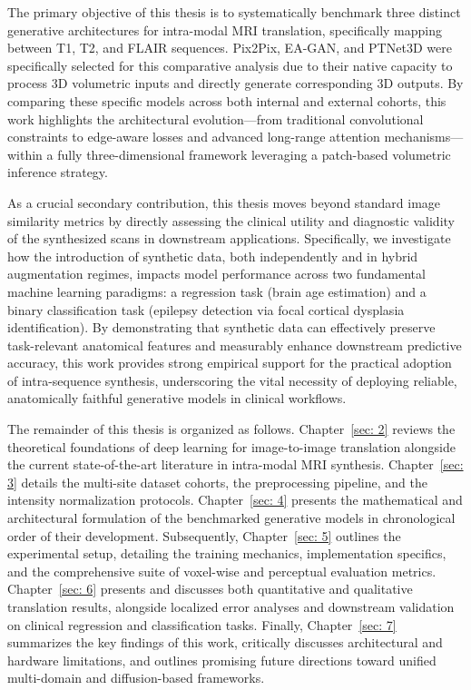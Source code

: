 \documentclass[11pt,a4paper]{article}
\begin{document}
The primary objective of this thesis is to systematically benchmark three distinct generative architectures for intra-modal MRI translation, specifically mapping between T1, T2, and FLAIR sequences. Pix2Pix, EA-GAN, and PTNet3D were specifically selected for this comparative analysis due to their native capacity to process 3D volumetric inputs and directly generate corresponding 3D outputs. By comparing these specific models across both internal and external cohorts, this work highlights the architectural evolution---from traditional convolutional constraints to edge-aware losses and advanced long-range attention mechanisms---within a fully three-dimensional framework leveraging a patch-based volumetric inference strategy.

As a crucial secondary contribution, this thesis moves beyond standard image similarity metrics by directly assessing the clinical utility and diagnostic validity of the synthesized scans in downstream applications. Specifically, we investigate how the introduction of synthetic data, both independently and in hybrid augmentation regimes, impacts model performance across two fundamental machine learning paradigms: a regression task (brain age estimation) and a binary classification task (epilepsy detection via focal cortical dysplasia identification). By demonstrating that synthetic data can effectively preserve task-relevant anatomical features and measurably enhance downstream predictive accuracy, this work provides strong empirical support for the practical adoption of intra-sequence synthesis, underscoring the vital necessity of deploying reliable, anatomically faithful generative models in clinical workflows.


The remainder of this thesis is organized as follows. Chapter~\ref{sec: 2} reviews the theoretical foundations of deep learning for image-to-image translation alongside the current state-of-the-art literature in intra-modal MRI synthesis. Chapter~\ref{sec: 3} details the multi-site dataset cohorts, the preprocessing pipeline, and the intensity normalization protocols. Chapter~\ref{sec: 4} presents the mathematical and architectural formulation of the benchmarked generative models in chronological order of their development. Subsequently, Chapter~\ref{sec: 5} outlines the experimental setup, detailing the training mechanics, implementation specifics, and the comprehensive suite of voxel-wise and perceptual evaluation metrics. Chapter~\ref{sec: 6} presents and discusses both quantitative and qualitative translation results, alongside localized error analyses and downstream validation on clinical regression and classification tasks. Finally, Chapter~\ref{sec: 7} summarizes the key findings of this work, critically discusses architectural and hardware limitations, and outlines promising future directions toward unified multi-domain and diffusion-based frameworks.
\end{document}
